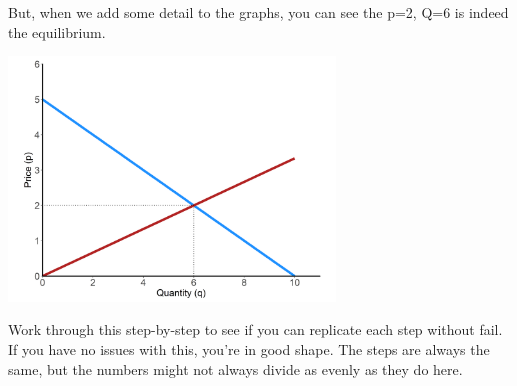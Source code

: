\documentclass[11pt,]{article}
\begin{document}
But, when we add some detail to the graphs, you can see the p=2, Q=6 is
indeed the equilibrium.

\begin{center}
\includegraphics[width=0.65\textwidth]{../images/eg_equil.png}
\end{center}

Work through this step-by-step to see if you can replicate each step
without fail. If you have no issues with this, you're in good shape. The
steps are always the same, but the numbers might not always divide as
evenly as they do here.
\end{document}
